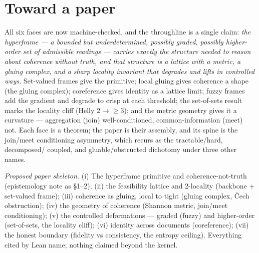 \documentclass[11pt]{article}
\begin{document}
\section*{Toward a paper}
All six faces are now machine-checked, and the throughline is a single
claim: \emph{the hyperframe --- a bounded but underdetermined, possibly
graded, possibly higher-order set of admissible readings --- carries
exactly the structure needed to reason about coherence without truth, and
that structure is a lattice with a metric, a gluing complex, and a sharp
locality invariant that degrades and lifts in controlled ways.}
Set-valued frames give the primitive; local gluing gives coherence a
shape (the gluing complex); coreference gives identity as a lattice
limit; fuzzy frames add the gradient and degrade to crisp at each
threshold; the set-of-sets result marks the locality cliff (Helly $2 \to
\geq 3$); and the metric geometry gives it a curvature --- aggregation
(join) well-conditioned, common-information (meet) not.  Each face is a
theorem; the paper is their assembly, and its spine is the join/meet
conditioning asymmetry, which recurs as the tractable/hard, decomposed/
coupled, and gluable/obstructed dichotomy under three other names.

\emph{Proposed paper skeleton.}  (i) The hyperframe primitive and
coherence-not-truth (epistemology note as \S1--2); (ii) the feasibility
lattice and 2-locality (backbone + set-valued frame); (iii) coherence as
gluing, local to tight (gluing complex, Čech obstruction); (iv) the
geometry of coherence (Shannon metric, join/meet conditioning); (v) the
controlled deformations --- graded (fuzzy) and higher-order (set-of-sets,
the locality cliff); (vi) identity across documents (coreference); (vii)
the honest boundary (fidelity vs consistency, the entropy ceiling).
Everything cited by Lean name; nothing claimed beyond the kernel.



\end{document}
